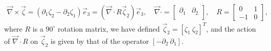 \documentclass{cmslatex}
\begin{document}
\begin{align}\label{eq:Curl_2D}
  \vec{\nabla}\times\vec{\zeta}=(\partial_1\zeta_2-\partial_2\zeta_1)\vec{e}_3
%  
%  
  =(\vec{\nabla}\cdot R\vec{\zeta}_2)\vec{e}_3,
%
  \quad
%  
  \vec{\nabla}\cdot
    =\left[
    \begin{array}{ccc}
       \partial_1  &   \partial_2 \\      
    \end{array}
  \right],
  \quad
  R=
  \left[
    \begin{array}{rr}
        0  &  1  \\
       -1  &  0  
    \end{array}
  \right],
\end{align}
%
where $R$ is a $90^\circ$ rotation matrix, we have defined
$\vec{\zeta}_2=[\zeta_1~\zeta_2]^T$, and the action of $\vec{\nabla}\cdot R$ on $\vec{\zeta}_2$
is given by that of the operator $[ - \partial_2 \ \partial_1]$.
\end{document}
